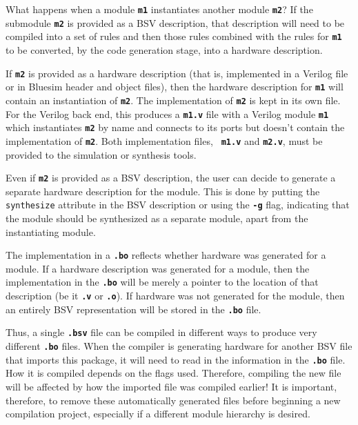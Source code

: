 \documentclass{article}
\newcommand{\te}[1]{\texttt{#1}}
\begin{document}
 What happens when
a module {\bf\tt m1} instantiates another module {\bf\tt m2}?
If the submodule {\bf\tt m2} is provided as a BSV
description, that description will need to be compiled into a set of
rules and then those rules combined with the rules for {\bf\tt m1} to
be converted, by the code generation stage, into a  hardware
description.

If {\bf\tt m2} is provided as a hardware
description (that is, implemented in a Verilog file or in Bluesim header and
object files), then the hardware description for {\bf\tt m1} will
contain an instantiation of {\bf\tt m2}.  The implementation of
{\bf\tt m2} is kept in its own file.
For the Verilog back end, this produces a {\bf\tt m1.v}
file with a Verilog module {\bf\tt m1} which instantiates {\bf\tt m2}
by name and connects to its ports but doesn't contain the
implementation of {\bf\tt m2}. Both implementation files, {\bf\tt
m1.v} and {\bf\tt m2.v}, must be provided to the simulation or
synthesis tools.

\index{-g@\te{-g} (compiler flag)}

Even if {\bf\tt m2} is provided as a BSV description, the user can
decide to generate a separate hardware description for the module.
This is done by putting the \te{synthesize} attribute in the BSV
description   or using the
{\bf\tt -g} flag, indicating that
 the module should be synthesized
as a separate module, apart from the instantiating module.

\index{.bo@\te{.bo} (file type)}
 The
implementation in a {\bf\tt .bo} reflects whether hardware was
generated for a module.  If a hardware description was generated for a
module, then the implementation in the {\bf\tt .bo} will be merely a
pointer to the location of that description (be it {\bf\tt .v} or
{\bf\tt .o}). If hardware was not generated for the module, then an
entirely BSV representation will be stored in the {\bf\tt .bo} file.

Thus, a single {\bf\tt .bsv} file can be compiled in different ways to
produce very different {\bf\tt .bo} files.  When the
compiler is generating hardware for another BSV file that imports this
package, it will need to read in the information in the {\bf\tt .bo}
file. How it is compiled depends on the flags used. Therefore, compiling the
new file will be affected by how the imported file was compiled earlier!  It
is important, therefore, to remove these automatically generated files
before beginning a new compilation project, especially if a different
module hierarchy is desired.
\end{document}
